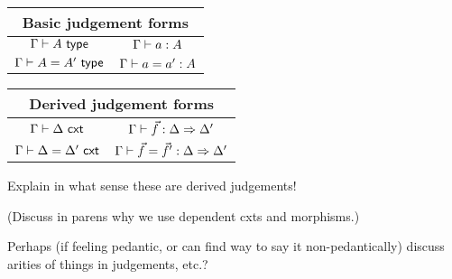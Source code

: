 \begin{center}\begin{tabular}{|@{\ }c@{\qquad \qquad}c@{\ }|}
\hline
\multicolumn{2}{|c|}{Basic judgement forms} \\
\hline
$\Gamma \vdash A \ \mathsf{type} $ & $ \Gamma \vdash a:A $ \\
$\Gamma \vdash A = A' \ \mathsf{type} $& $ \Gamma \vdash a = a' : A $ \\
\hline
\end{tabular}

\begin{tabular}{|@{\ }c@{\qquad \qquad}c@{\ }|}
\hline
\multicolumn{2}{|c|}{Derived judgement forms} \\
\hline
$ \Gamma \vdash \Delta \ \mathsf{cxt}$ & $\Gamma \vdash {\vec f} : \Delta \Rightarrow \Delta' $  \\
$ \Gamma \vdash \Delta = \Delta' \ \mathsf{cxt}$ & $\Gamma \vdash {\vec f} = {\vec f}' : \Delta \Rightarrow \Delta'$ \\
\hline
\end{tabular}

Explain in what sense these are derived judgements!

(Discuss in parens why we use dependent cxts and morphisms.)

Perhaps (if feeling pedantic, or can find way to say it non-pedantically) discuss arities of things in judgements, etc.?

 \label{para:structural-core}



\end{center}
